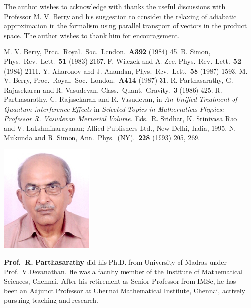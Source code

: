 The author wishes to acknowledge with thanks the useful discussions with Professor M. V. Berry and his suggestion 
to consider the relaxing of adiabatic approximation in the formalism using parallel transport of vectors in the 
product space. The author wishes to thank him for encouragement.  

\begin{thebibliography}{99}
 M. V. Berry, Proc.\ Royal.\ Soc.\ London.\ {\bf{A392}} (1984) 45.
 B. Simon, Phys.\ Rev.\ Lett.\ {\bf 51} (1983) 2167.
 F. Wilczek and A. Zee, Phys.\ Rev.\ Lett.\ {\bf 52} (1984) 2111.
 Y. Aharonov and J. Anandan, Phys.\ Rev.\ Lett.\ {\bf 58} (1987) 1593.
 M. V. Berry, Proc.\ Royal.\ Soc.\ London.\ {\bf A414} (1987) 31.  
 R. Parthasarathy, G. Rajasekaran and R. Vasudevan, Class.\ Quant.\ Gravity.\ {\bf 3} (1986) 425.
 R. Parthasarathy, G. Rajasekaran and R. Vasudevan, in {\textit{An Unified Treatment of Quantum Interference Effects}} in \textit{Selected Topics in Mathematical Physics: Professor R. Vasudevan Memorial Volume.} Eds.\ R. Sridhar, K. Srinivasa Rao and V. Lakshminarayanan; Allied Publishers Ltd., New Delhi, India, 1995.
 N. Mukunda and R. Simon, Ann.\ Phys.\ (NY).\ {\bf 228} (1993) 205, 269.
\end{thebibliography}
\vskip 0.5cm

\centerline{\includegraphics[scale=1.8]{authorsphotos/Prof_R_Parthasarathy.eps}}
\bigskip

\noindent
\textbf{Prof.\ R. Parthasarathy} did his Ph.D. from University of Madras under Prof.\ V.Devanathan. He was a faculty member of the Institute of Mathematical Sciences, Chennai. After his retirement as Senior Professor from IMSc, he has been an Adjunct Professor at Chennai Mathematical Institute, Chennai, actively pursuing teaching and research.



